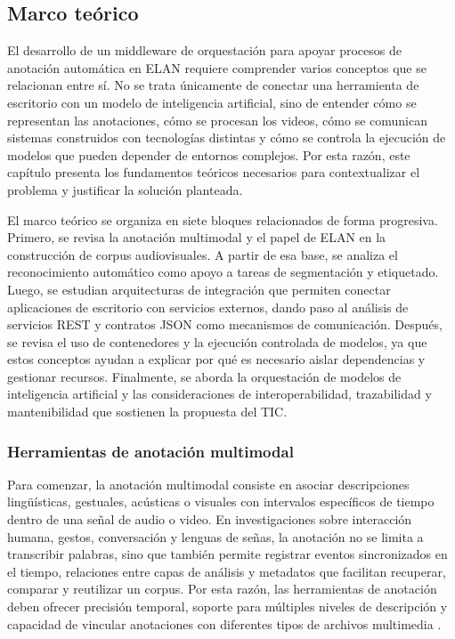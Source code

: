 \subsection{Marco teórico}

El desarrollo de un middleware de orquestación para apoyar procesos de anotación automática en ELAN requiere comprender varios conceptos que se relacionan entre sí. No se trata únicamente de conectar una herramienta de escritorio con un modelo de inteligencia artificial, sino de entender cómo se representan las anotaciones, cómo se procesan los videos, cómo se comunican sistemas construidos con tecnologías distintas y cómo se controla la ejecución de modelos que pueden depender de entornos complejos. Por esta razón, este capítulo presenta los fundamentos teóricos necesarios para contextualizar el problema y justificar la solución planteada.

El marco teórico se organiza en siete bloques relacionados de forma progresiva. Primero, se revisa la anotación multimodal y el papel de ELAN en la construcción de corpus audiovisuales. A partir de esa base, se analiza el reconocimiento automático como apoyo a tareas de segmentación y etiquetado. Luego, se estudian arquitecturas de integración que permiten conectar aplicaciones de escritorio con servicios externos, dando paso al análisis de servicios REST y contratos JSON como mecanismos de comunicación. Después, se revisa el uso de contenedores y la ejecución controlada de modelos, ya que estos conceptos ayudan a explicar por qué es necesario aislar dependencias y gestionar recursos. Finalmente, se aborda la orquestación de modelos de inteligencia artificial y las consideraciones de interoperabilidad, trazabilidad y mantenibilidad que sostienen la propuesta del TIC.

\subsubsection{Herramientas de anotación multimodal}

Para comenzar, la anotación multimodal consiste en asociar descripciones lingüísticas, gestuales, acústicas o visuales con intervalos específicos de tiempo dentro de una señal de audio o video. En investigaciones sobre interacción humana, gestos, conversación y lenguas de señas, la anotación no se limita a transcribir palabras, sino que también permite registrar eventos sincronizados en el tiempo, relaciones entre capas de análisis y metadatos que facilitan recuperar, comparar y reutilizar un corpus. Por esta razón, las herramientas de anotación deben ofrecer precisión temporal, soporte para múltiples niveles de descripción y capacidad de vincular anotaciones con diferentes tipos de archivos multimedia \cite{wittenburg2006elan}.

